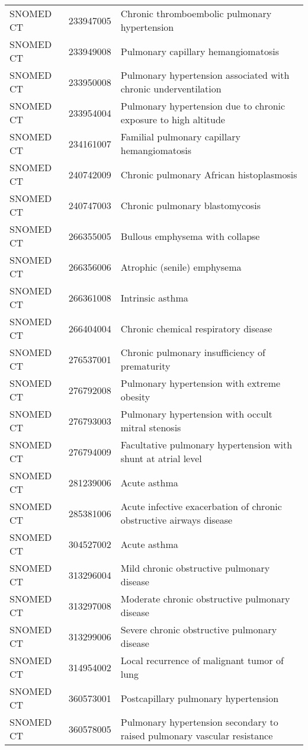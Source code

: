\begin{table}[ht]
\begin{tabular}{lll}
  SNOMED CT & 233947005 & Chronic thromboembolic pulmonary hypertension \\ 
  SNOMED CT & 233949008 & Pulmonary capillary hemangiomatosis \\ 
  SNOMED CT & 233950008 & Pulmonary hypertension associated with chronic underventilation \\ 
  SNOMED CT & 233954004 & Pulmonary hypertension due to chronic exposure to high altitude \\ 
  SNOMED CT & 234161007 & Familial pulmonary capillary hemangiomatosis \\ 
  SNOMED CT & 240742009 & Chronic pulmonary African histoplasmosis \\ 
  SNOMED CT & 240747003 & Chronic pulmonary blastomycosis \\ 
  SNOMED CT & 266355005 & Bullous emphysema with collapse \\ 
  SNOMED CT & 266356006 & Atrophic (senile) emphysema \\ 
  SNOMED CT & 266361008 & Intrinsic asthma \\ 
  SNOMED CT & 266404004 & Chronic chemical respiratory disease \\ 
  SNOMED CT & 276537001 & Chronic pulmonary insufficiency of prematurity \\ 
  SNOMED CT & 276792008 & Pulmonary hypertension with extreme obesity \\ 
  SNOMED CT & 276793003 & Pulmonary hypertension with occult mitral stenosis \\ 
  SNOMED CT & 276794009 & Facultative pulmonary hypertension with shunt at atrial level \\ 
  SNOMED CT & 281239006 & Acute asthma \\ 
  SNOMED CT & 285381006 & Acute infective exacerbation of chronic obstructive airways disease \\ 
  SNOMED CT & 304527002 & Acute asthma \\ 
  SNOMED CT & 313296004 & Mild chronic obstructive pulmonary disease \\ 
  SNOMED CT & 313297008 & Moderate chronic obstructive pulmonary disease \\ 
  SNOMED CT & 313299006 & Severe chronic obstructive pulmonary disease \\ 
  SNOMED CT & 314954002 & Local recurrence of malignant tumor of lung \\ 
  SNOMED CT & 360573001 & Postcapillary pulmonary hypertension \\ 
  SNOMED CT & 360578005 & Pulmonary hypertension secondary to raised pulmonary vascular resistance \\ 

\end{tabular}
\end{table}
